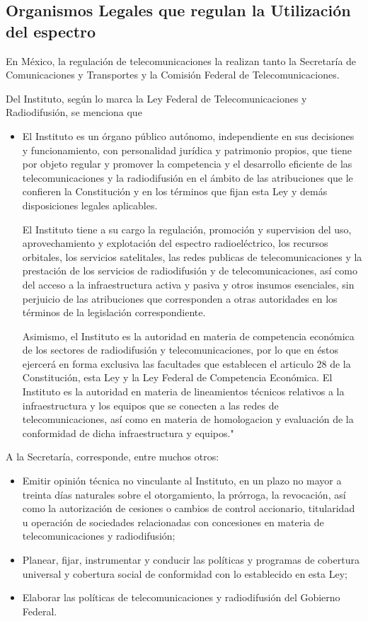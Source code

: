 \documentclass[12pt,letterpaper,titlepage,twoside]{book}
\begin{document}
\subsection{Organismos Legales que regulan la Utilización del espectro}

En México, la regulación de telecomunicaciones la realizan tanto la Secretaría de Comunicaciones y Transportes y la Comisión Federal de Telecomunicaciones.

Del Instituto, según lo marca la Ley Federal de Telecomunicaciones y Radiodifusión, se menciona que 
\begin{itemize}
\item El Instituto es un  órgano público autónomo, independiente en sus decisiones y funcionamiento, con personalidad jurídica y patrimonio propios, que tiene por objeto regular y promover la competencia y el desarrollo eficiente de las telecomunicaciones y la radiodifusión en el ámbito de las atribuciones que le confieren la Constitución y en los términos que fijan esta Ley y demás disposiciones legales aplicables. 

El Instituto tiene a su cargo la regulación, promoción y supervision del uso, aprovechamiento y explotación del espectro radioeléctrico, los recursos orbitales, los servicios satelitales, las redes publicas de telecomunicaciones y la prestación de los servicios de radiodifusión y de telecomunicaciones, así como del acceso a la infraestructura activa y pasiva y otros insumos esenciales, sin perjuicio de las atribuciones que corresponden a otras autoridades en los términos de la legislación correspondiente.

Asimismo, el Instituto es la autoridad en materia de competencia económica de los sectores de radiodifusión y telecomunicaciones, por lo que en éstos ejercerá en forma exclusiva las facultades que establecen el articulo 28 de la Constitución, esta Ley y la Ley Federal de Competencia Económica.
El Instituto es la autoridad en materia de lineamientos técnicos relativos a la infraestructura y los equipos que se conecten a las redes de telecomunicaciones, así como en materia de homologacion y evaluación de la conformidad de dicha infraestructura y equipos."
\end{itemize}

A la Secretaría, corresponde, entre muchos otros:

\begin{itemize}
\item Emitir opinión técnica no vinculante al Instituto, en un plazo no mayor a treinta días naturales sobre el otorgamiento, la prórroga, la revocación, así como la autorización de cesiones o cambios de control accionario, titularidad u operación de sociedades relacionadas con concesiones en materia de telecomunicaciones y radiodifusión;
\item Planear, fijar, instrumentar y conducir las políticas y programas de cobertura universal y cobertura social de conformidad con lo establecido en esta Ley;
\item Elaborar las políticas de telecomunicaciones y radiodifusión del Gobierno Federal.
\end{itemize}
\end{document}
